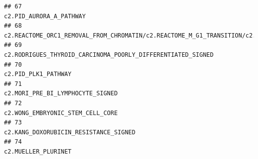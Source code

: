 \documentclass{article}\usepackage[]{graphicx}\usepackage[]{color}
\makeatletter
\newenvironment{kframe}{%
 \def\at@end@of@kframe{}%
 \ifinner\ifhmode%
  \def\at@end@of@kframe{\end{minipage}}%
  \begin{minipage}{\columnwidth}%
 \fi\fi%
 \def\FrameCommand##1{\hskip\@totalleftmargin \hskip-\fboxsep
 \colorbox{shadecolor}{##1}\hskip-\fboxsep
     \hskip-\linewidth \hskip-\@totalleftmargin \hskip\columnwidth}%
 \MakeFramed {\advance\hsize-\width
   \@totalleftmargin\z@ \linewidth\hsize
   \@setminipage}}%
 {\par\unskip\endMakeFramed%
 \at@end@of@kframe}
\newenvironment{knitrout}{}{} %
\makeatother
\begin{document}
\begin{knitrout}
\begin{kframe}
\begin{verbatim}
## 67                                                                                                                                                                                                                                                                                                                                c2.PID_AURORA_A_PATHWAY
## 68                                                                                                                                                                                                                                c2.REACTOME_ORC1_REMOVAL_FROM_CHROMATIN/c2.REACTOME_M_G1_TRANSITION/c2.REACTOME_ASSEMBLY_OF_THE_PRE_REPLICATIVE_COMPLEX
## 69                                                                                                                                                                                                                                                                                            c2.RODRIGUES_THYROID_CARCINOMA_POORLY_DIFFERENTIATED_SIGNED
## 70                                                                                                                                                                                                                                                                                                                                    c2.PID_PLK1_PATHWAY
## 71                                                                                                                                                                                                                                                                                                                       c2.MORI_PRE_BI_LYMPHOCYTE_SIGNED
## 72                                                                                                                                                                                                                                                                                                                       c2.WONG_EMBRYONIC_STEM_CELL_CORE
## 73                                                                                                                                                                                                                                                                                                                  c2.KANG_DOXORUBICIN_RESISTANCE_SIGNED
## 74                                                                                                                                                                                                                                                                                                                                    c2.MUELLER_PLURINET

\end{verbatim}
\end{kframe}
\end{knitrout}
\end{document}
